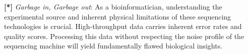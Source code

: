 \documentclass[11pt, a4paper]{article}
\newcommand{\sta}{\textbf{[*] }}
\begin{document}
\sta \textit{Garbage in, Garbage out}: As a bioinformatician, understanding the experimental source and inherent physical limitations of these sequencing technologies is crucial. High-throughput data carries inherent error rates and quality scores. Processing this data without respecting the noise profile of the sequencing machine will yield fundamentally flawed biological insights.
\end{document}
